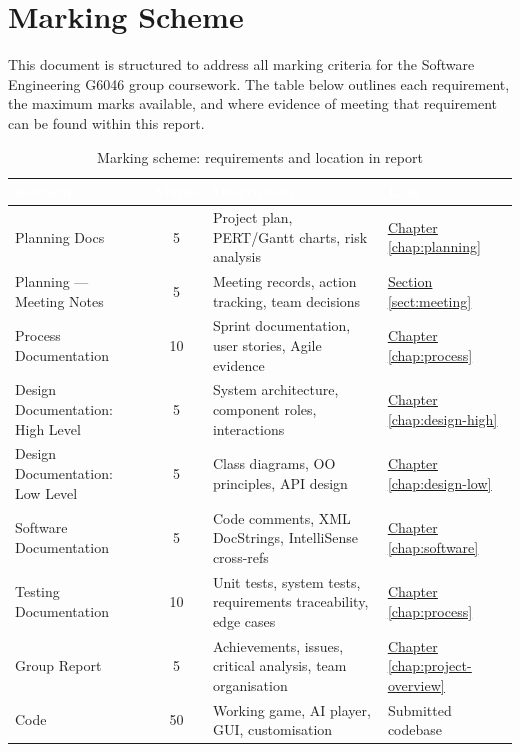 \chapter*{Marking Scheme}

This document is structured to address all marking criteria for the Software Engineering G6046 group coursework. The table below outlines each requirement, the maximum marks available, and where evidence of meeting that requirement can be found within this report.

\vspace{1cm}

\begin{table}[H]
\centering
\footnotesize
\setlength{\tabcolsep}{4pt}
\begin{tabular}{|p{2.6cm}|c|p{4.2cm}|p{2.2cm}|}
\hline
\rowcolor{darkblue}
\textcolor{white}{\textbf{Element}} &
\textcolor{white}{\textbf{Marks}} &
\textcolor{white}{\textbf{Description}} &
\textcolor{white}{\textbf{Link}} \\
\hline
Planning Docs & 5 & Project plan, PERT/Gantt charts, risk analysis & \hyperref[chap:planning]{\color{blue}\underline{Chapter \ref*{chap:planning}}} \\
\hline
Planning --- Meeting Notes & 5 & Meeting records, action tracking, team decisions & \hyperref[sect:meeting]{\color{blue}\underline{Section \ref*{sect:meeting}}} \\
\hline
Process Docu\-mentation & 10 & Sprint documentation, user stories, Agile evidence & \hyperref[chap:process]{\color{blue}\underline{Chapter \ref*{chap:process}}} \\
\hline
Design Docu\-mentation: High Level & 5 & System architecture, component roles, interactions & \hyperref[chap:design-high]{\color{blue}\underline{Chapter \ref*{chap:design-high}}} \\
\hline
Design Docu\-mentation: Low Level & 5 & Class diagrams, OO principles, API design & \hyperref[chap:design-low]{\color{blue}\underline{Chapter \ref*{chap:design-low}}} \\
\hline
Software Docu\-mentation & 5 & Code comments, XML DocStrings, IntelliSense cross-refs & \hyperref[chap:software]{\color{blue}\underline{Chapter \ref*{chap:software}}} \\
\hline
Testing Docu\-mentation & 10 & Unit tests, system tests, requirements traceability, edge cases & \hyperref[chap:process]{\color{blue}\underline{Chapter \ref*{chap:process}}} \\
\hline
Group Report & 5 & Achievements, issues, critical analysis, team organisation & \hyperref[chap:project-overview]{\color{blue}\underline{Chapter \ref*{chap:project-overview}}} \\
\hline
Code & 50 & Working game, AI player, GUI, customisation & Submitted codebase \\
\hline
\end{tabular}
\caption{Marking scheme: requirements and location in report}
\end{table}

